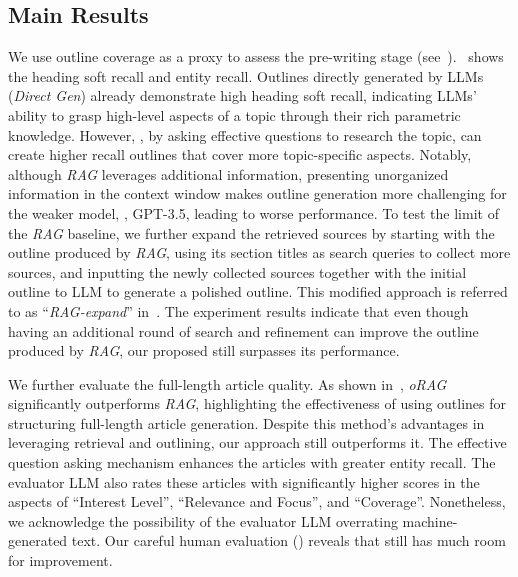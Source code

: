\label{sec:results}


\subsection{Main Results}
\label{sec:main_result}

We use outline coverage as a proxy to assess the pre-writing stage (see~).~ shows the heading soft recall and entity recall. %
Outlines directly generated by LLMs (\textit{Direct Gen}) already demonstrate high heading soft recall, indicating LLMs' ability to grasp high-level aspects of a topic through their rich parametric knowledge. However, \system, by asking effective questions to research the topic, can create higher recall outlines that cover more topic-specific aspects. Notably, although \textit{RAG} leverages additional information, %
presenting unorganized information in the context window makes outline generation more challenging for the weaker model, \ie, GPT-3.5, leading to worse performance. To test the limit of the \textit{RAG} baseline, we further expand the retrieved sources by starting with the outline produced by \textit{RAG}, using its section titles as search queries to collect more sources, and inputting the newly collected sources together with the initial outline to LLM to generate a polished outline. This modified approach is referred to as ``\textit{RAG-expand}'' in~. The experiment results indicate that even though having an additional round of search and refinement can improve the outline produced by \textit{RAG}, our proposed \system still surpasses its performance.

We further evaluate the full-length article quality. %
As shown in~, \textit{oRAG} significantly outperforms \textit{RAG}, highlighting the effectiveness of using outlines for structuring full-length article generation. Despite this method's advantages in leveraging retrieval and outlining, our approach still outperforms it. %
The effective question asking mechanism %
enhances the articles with greater entity recall. The evaluator LLM also rates these articles with significantly higher scores in the aspects of ``Interest Level'',  ``Relevance and Focus'', and ``Coverage''. Nonetheless, we acknowledge the possibility of the evaluator LLM overrating machine-generated text. Our careful human evaluation () reveals that \system still has much room for improvement.

